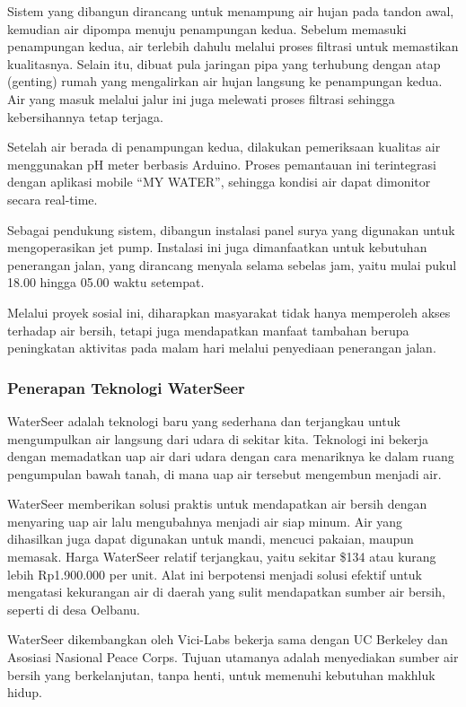 \documentclass[../wastek.tex]{subfiles}
\begin{document}
Sistem yang dibangun dirancang untuk menampung air hujan pada tandon awal, kemudian air dipompa menuju penampungan kedua. Sebelum memasuki penampungan kedua, air terlebih dahulu melalui proses filtrasi untuk memastikan kualitasnya. Selain itu, dibuat pula jaringan pipa yang terhubung dengan atap (genting) rumah yang mengalirkan air hujan langsung ke penampungan kedua. Air yang masuk melalui jalur ini juga melewati proses filtrasi sehingga kebersihannya tetap terjaga.

Setelah air berada di penampungan kedua, dilakukan pemeriksaan kualitas air menggunakan pH meter berbasis Arduino. Proses pemantauan ini terintegrasi dengan aplikasi mobile “MY WATER”, sehingga kondisi air dapat dimonitor secara real-time.

Sebagai pendukung sistem, dibangun instalasi panel surya yang digunakan untuk mengoperasikan jet pump. Instalasi ini juga dimanfaatkan untuk kebutuhan penerangan jalan, yang dirancang menyala selama sebelas jam, yaitu mulai pukul 18.00 hingga 05.00 waktu setempat.

Melalui proyek sosial ini, diharapkan masyarakat tidak hanya memperoleh akses terhadap air bersih, tetapi juga mendapatkan manfaat tambahan berupa peningkatan aktivitas pada malam hari melalui penyediaan penerangan jalan.

\subsubsection{Penerapan Teknologi WaterSeer}%
\label{ssub:penerapan_teknologi_waterseer}

WaterSeer adalah teknologi baru yang sederhana dan terjangkau untuk mengumpulkan air langsung dari udara di sekitar kita. Teknologi ini bekerja dengan memadatkan uap air dari udara dengan cara menariknya ke dalam ruang pengumpulan bawah tanah, di mana uap air tersebut mengembun menjadi air.

WaterSeer memberikan solusi praktis untuk mendapatkan air bersih dengan menyaring uap air lalu mengubahnya menjadi air siap minum. Air yang dihasilkan juga dapat digunakan untuk mandi, mencuci pakaian, maupun memasak. Harga WaterSeer relatif terjangkau, yaitu sekitar \$134 atau kurang lebih Rp1.900.000 per unit. Alat ini berpotensi menjadi solusi efektif untuk mengatasi kekurangan air di daerah yang sulit mendapatkan sumber air bersih, seperti di desa Oelbanu.

WaterSeer dikembangkan oleh Vici-Labs bekerja sama dengan UC Berkeley dan Asosiasi Nasional Peace Corps. Tujuan utamanya adalah menyediakan sumber air bersih yang berkelanjutan, tanpa henti, untuk memenuhi kebutuhan makhluk hidup.
\end{document}
